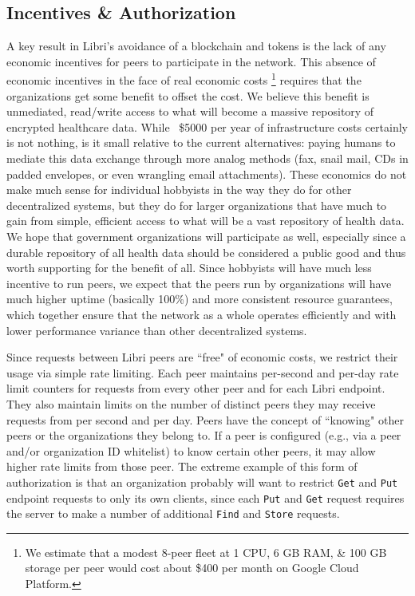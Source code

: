 \documentclass[10pt]{article}
\newcommand{\ttt}[1]{\texttt{#1}}
\begin{document}
\subsection{Incentives \& Authorization}
\label{sec:Incentives}
A key result in Libri's avoidance of a blockchain and tokens is the lack of any economic incentives for peers to participate in the network. This absence of economic incentives in the face of real economic costs \footnote{We estimate that a modest 8-peer fleet at 1 CPU, 6 GB RAM, \& 100 GB storage per peer would cost about \$400 per month on Google Cloud Platform.} requires that the organizations get some benefit to offset the cost. We believe this benefit is unmediated, read/write access to what will become a massive repository of encrypted healthcare data. While ~\$5000 per year of infrastructure costs certainly is not nothing, is it small relative to the current alternatives: paying humans to mediate this data exchange through more analog methods (fax, snail mail, CDs in padded envelopes, or even wrangling email attachments). These economics do not make much sense for individual hobbyists in the way they do for other decentralized systems, but they do for larger organizations that have much to gain from simple, efficient access to what will be a vast repository of health data. We hope that government organizations will participate as well, especially since a durable repository of all health data should be considered a public good and thus worth supporting for the benefit of all. Since hobbyists will have much less incentive to run peers, we expect that the peers run by organizations will have much higher uptime (basically 100\%) and more consistent resource guarantees, which together ensure that the network as a whole operates efficiently and with lower performance variance than other decentralized systems.

Since requests between Libri peers are ``free" of economic costs, we restrict their usage via simple rate limiting. Each peer maintains per-second and per-day rate limit counters for requests from every other peer and for each Libri endpoint. They also maintain limits on the number of distinct peers they may receive requests from per second and per day. Peers have the concept of ``knowing" other peers or the organizations they belong to. If a peer is configured (e.g., via a peer and/or organization ID whitelist) to know certain other peers, it may allow higher rate limits from those peer. The extreme example of this form of authorization is that an organization probably will want to restrict \ttt{Get} and \texttt{Put} endpoint requests to only its own clients, since each \texttt{Put} and \texttt{Get} request requires the server to make a number of additional \texttt{Find} and \texttt{Store} requests. 
\end{document}
